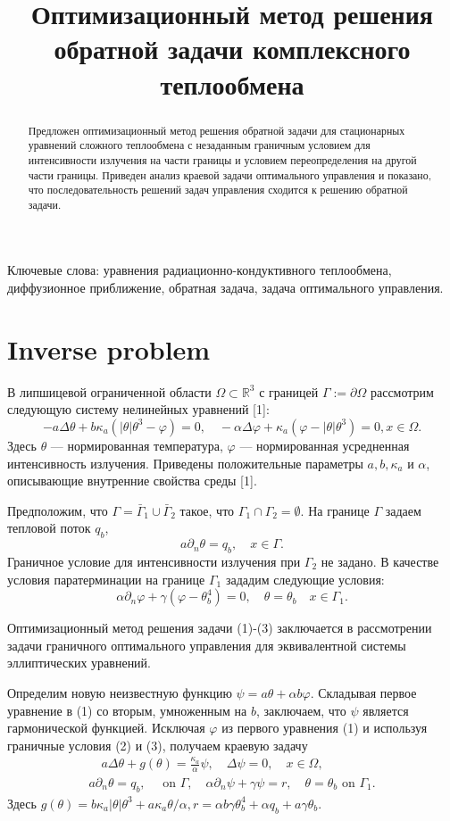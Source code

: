 \documentclass[10pt]{article}
\title{Оптимизационный метод решения обратной задачи комплексного теплообмена}
\begin{document}
\maketitle

\begin{abstract}
Предложен оптимизационный метод решения обратной задачи для стационарных уравнений сложного
теплообмена с незаданным граничным условием для интенсивности излучения на части
границы и условием переопределения на другой части границы.
Приведен анализ краевой задачи оптимального управления и показано,
что последовательность решений задач управления сходится к решению обратной задачи.
\end{abstract}

Ключевые слова: уравнения радиационно-кондуктивного теплообмена,
диффузионное приближение, обратная задача, задача оптимального управления.


\section{Inverse problem}
В липшицевой ограниченной области $\Omega \subset \mathbb{R}^{3}$ с границей
$\Gamma:=\partial \Omega$ рассмотрим следующую систему нелинейных уравнений [1]:
\[
-a \Delta \theta+b \kappa_{a}\left(|\theta| \theta^{3}-\varphi\right)=0,
\quad-\alpha \Delta \varphi+\kappa_{a}\left(\varphi-|\theta| \theta^{3}\right)=0, x \in \Omega.
\]
Здесь $\theta$ — нормированная температура, $\varphi$ — нормированная усредненная интенсивность излучения.
Приведены положительные параметры $a, b, \kappa_{a}$ и $\alpha$, описывающие внутренние свойства среды [1].


Предположим, что $\Gamma=\bar{\Gamma}_{1} \cup \bar{\Gamma}_{2}$ такое,
 что $\Gamma_{1} \cap \Gamma_{2}=\emptyset$.
На границе $\Gamma$ задаем тепловой поток $q_{b}$,
\[
a \partial_{n} \theta=q_{b}, \quad x \in \Gamma.
\]
Граничное условие для интенсивности излучения при $\Gamma_{2}$ не задано.
 В качестве условия паратерминации на границе $\Gamma_{1}$ зададим следующие условия:
\[
\alpha \partial_{n} \varphi+\gamma\left(\varphi-\theta_{b}^{4}\right)=0,
\quad \theta=\theta_{b} \quad x \in \Gamma_{ 1} .
\]

Оптимизационный метод решения задачи (1)-(3) заключается в рассмотрении задачи
граничного оптимального управления для эквивалентной системы эллиптических уравнений.

Определим новую неизвестную функцию $\psi=a \theta+\alpha b \varphi$.
Складывая первое уравнение в (1) со вторым, умноженным на $b$, заключаем,
что $\psi$ является гармонической функцией. Исключая $\varphi$ из первого
уравнения (1) и используя граничные условия (2) и (3), получаем краевую задачу
\[
\begin{gathered}
\quad a \Delta \theta+g(\theta)=\frac{\kappa_{a}}{\alpha} \psi, \quad \Delta \psi=0, \quad x \in \Omega, \\
a \partial_{n} \theta=q_{b}, \quad \text { on } \Gamma, \quad \alpha \partial_{n} \psi+\gamma \psi=r, \quad \theta=\theta_{ b} \text { on } \Gamma_{1} .
\end{gathered}
\]
Здесь $g(\theta)=b \kappa_{a}|\theta| \theta^{3}+a \kappa_{a} \theta / \alpha,
r=\alpha b \gamma \theta_{b}^{4}+\alpha q_{b}+a \gamma \theta_{b }$.
\end{document}
